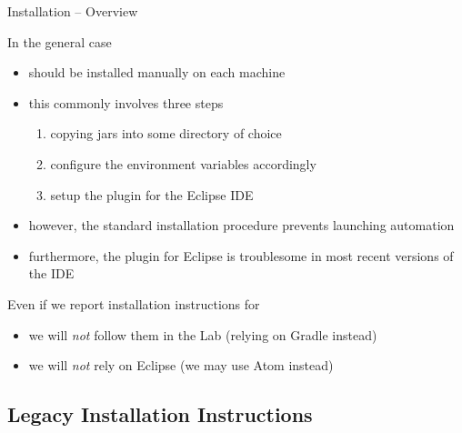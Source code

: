 \documentclass[presentation]{beamer}\mode<presentation>{\usetheme{AMSBolognaFC}}
\begin{document}
\begin{frame}[c]{\jason{} Installation -- Overview}
    
    In the general case
    \begin{itemize}
        \item \jason{} should be installed \alert{manually} on each machine 
        
        \vfill
        
        \item this commonly involves three steps
        \begin{enumerate}
            \item copying \jason{} jars into some directory of choice
            \item configure the environment variables accordingly
            \item setup the \jason{} plugin for the Eclipse IDE
        \end{enumerate}
        
        \vfill
        
        \item however, the standard installation procedure prevents \jason{} launching automation
        
        \vfill
        
        \item furthermore, the \jason{} plugin for Eclipse is troublesome in most recent versions of the IDE
        
    \end{itemize}
    
    \vfill
    
    \begin{alertblock}{Even if we report installation instructions for \jason{}}
        \begin{itemize}
            \item we will \emph{not} follow them in the Lab (relying on Gradle instead)

            \item we will \emph{not} rely on Eclipse (we may use Atom instead)
        \end{itemize}
    \end{alertblock}
        
\end{frame}

\subsection{Legacy Installation Instructions}
\end{document}
